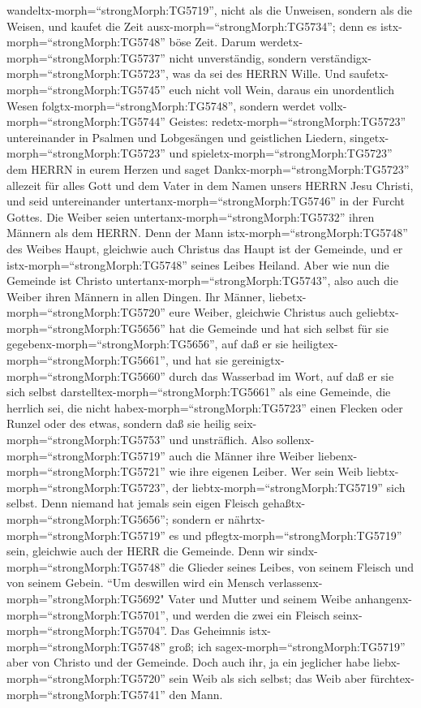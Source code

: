 wandeltx-morph=``strongMorph:TG5719'', nicht als die Unweisen, sondern
als die Weisen,  und kaufet die Zeit
ausx-morph=``strongMorph:TG5734''; denn es
istx-morph=``strongMorph:TG5748'' böse Zeit.  Darum
werdetx-morph=``strongMorph:TG5737'' nicht unverständig, sondern
verständigx-morph=``strongMorph:TG5723'', was da sei des HERRN Wille.
 Und saufetx-morph=``strongMorph:TG5745'' euch nicht voll
Wein, daraus ein unordentlich Wesen folgtx-morph=``strongMorph:TG5748'',
sondern werdet vollx-morph=``strongMorph:TG5744'' Geistes: 
redetx-morph=``strongMorph:TG5723'' untereinander in Psalmen und
Lobgesängen und geistlichen Liedern,
singetx-morph=``strongMorph:TG5723'' und
spieletx-morph=``strongMorph:TG5723'' dem HERRN in eurem Herzen
 und saget Dankx-morph=``strongMorph:TG5723'' allezeit für
alles Gott und dem Vater in dem Namen unsers HERRN Jesu Christi,
 und seid untereinander
untertanx-morph=``strongMorph:TG5746'' in der Furcht Gottes.
 Die Weiber seien untertanx-morph=``strongMorph:TG5732''
ihren Männern als dem HERRN.  Denn der Mann
istx-morph=``strongMorph:TG5748'' des Weibes Haupt, gleichwie auch
Christus das Haupt ist der Gemeinde, und er
istx-morph=``strongMorph:TG5748'' seines Leibes Heiland. 
Aber wie nun die Gemeinde ist Christo
untertanx-morph=``strongMorph:TG5743'', also auch die Weiber ihren
Männern in allen Dingen.  Ihr Männer,
liebetx-morph=``strongMorph:TG5720'' eure Weiber, gleichwie Christus
auch geliebtx-morph=``strongMorph:TG5656'' hat die Gemeinde und hat sich
selbst für sie gegebenx-morph=``strongMorph:TG5656'',  auf
daß er sie heiligtex-morph=``strongMorph:TG5661'', und hat sie
gereinigtx-morph=``strongMorph:TG5660'' durch das Wasserbad im Wort,
 auf daß er sie sich selbst
darstelltex-morph=``strongMorph:TG5661'' als eine Gemeinde, die herrlich
sei, die nicht habex-morph=``strongMorph:TG5723'' einen Flecken oder
Runzel oder des etwas, sondern daß sie heilig
seix-morph=``strongMorph:TG5753'' und unsträflich.  Also
sollenx-morph=``strongMorph:TG5719'' auch die Männer ihre Weiber
liebenx-morph=``strongMorph:TG5721'' wie ihre eigenen Leiber. Wer sein
Weib liebtx-morph=``strongMorph:TG5723'', der
liebtx-morph=``strongMorph:TG5719'' sich selbst.  Denn
niemand hat jemals sein eigen Fleisch
gehaßtx-morph=``strongMorph:TG5656''; sondern er
nährtx-morph=``strongMorph:TG5719'' es und
pflegtx-morph=``strongMorph:TG5719'' sein, gleichwie auch der HERR die
Gemeinde.  Denn wir sindx-morph=``strongMorph:TG5748'' die
Glieder seines Leibes, von seinem Fleisch und von seinem Gebein.
 ``Um deswillen wird ein Mensch
verlassenx-morph=''strongMorph:TG5692" Vater und Mutter und seinem Weibe
anhangenx-morph=``strongMorph:TG5701'', und werden die zwei ein Fleisch
seinx-morph=``strongMorph:TG5704''.  Das Geheimnis
istx-morph=``strongMorph:TG5748'' groß; ich
sagex-morph=``strongMorph:TG5719'' aber von Christo und der Gemeinde.
 Doch auch ihr, ja ein jeglicher habe
liebx-morph=``strongMorph:TG5720'' sein Weib als sich selbst; das Weib
aber fürchtex-morph=``strongMorph:TG5741'' den Mann.

